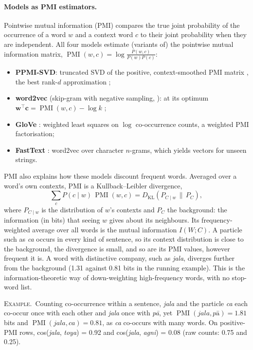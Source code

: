 \documentclass[11pt]{article}
\newcommand{\PMI}{\operatorname{PMI}}
\newcommand{\ex}{\par\smallskip\noindent\textsc{Example.}~}
\begin{document}
\paragraph{Models as PMI estimators.} Pointwise mutual information (PMI) compares the true joint probability of the occurrence of a word $w$ and a context word $c$ to their joint probability when they are independent. All four models estimate (variants of)
the pointwise mutual information matrix,
$\PMI(w,c)=\log\frac{P(w,c)}{P(w)P(c)}$:
\begin{itemize}
\item \textbf{PPMI-SVD}: truncated SVD of the positive, context-smoothed
  PMI matrix \citep{levy2015improving}, the best rank-$d$ approximation
  \citep{eckart1936approximation};
\item \textbf{word2vec} (skip-gram with negative sampling,
  \citealp{mikolov2013distributed}): at its optimum
  $\mathbf{w}^\top\mathbf{c}=\PMI(w,c)-\log k$ \citep{levy2014neural};
\item \textbf{GloVe} \citep{pennington2014glove}: weighted least squares on
  $\log$ co-occurrence counts, a weighted PMI factorisation;
\item \textbf{FastText} \citep{bojanowski2017enriching}: word2vec over
  character $n$-grams, which yields vectors for unseen strings.
\end{itemize}
PMI also explains how these models discount frequent words. Averaged over
a word's own contexts, PMI is a Kullback--Leibler divergence,
\[
\textstyle\sum_c P(c\mid w)\,\PMI(w,c)=D_{\mathrm{KL}}(P_{C\mid w}\,\|\,P_C),
\]
where $P_{C\mid w}$ is the distribution of $w$'s contexts and $P_C$ the
background: the information (in bits) that seeing $w$ gives about its
neighbours. Its frequency-weighted average over all words is the mutual
information $I(W;C)$. A particle such as \emph{ca} occurs in every kind of
sentence, so its context distribution is close to the background, the
divergence is small, and so are its PMI values, however frequent it is. A
word with distinctive company, such as \emph{jala}, diverges further from
the background (1.31 against 0.81 bits in the running example). This is
the information-theoretic way of down-weighting high-frequency words, with
no stop-word list.

\ex Counting co-occurrence within a sentence, \emph{jala} and the particle
\emph{ca} each co-occur once with each other and \emph{jala} once with
\emph{pā}, yet $\PMI(\textit{jala},\textit{pā})=1.81$ bits and
$\PMI(\textit{jala},\textit{ca})=0.81$, as \emph{ca} co-occurs with many words. On positive-PMI rows, cos(\emph{jala}, \emph{toya}) = 0.92 and
cos(\emph{jala}, \emph{agni}) = 0.08 (raw counts: 0.75 and 0.25).
\end{document}
